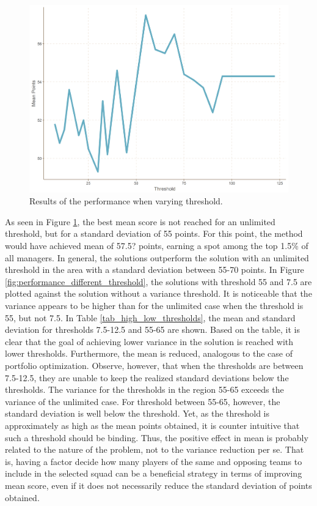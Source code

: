 \begin{figure}[H]
    \centering
    \includegraphics[scale=0.5]{fig/chapter_7/var.png}
    \caption{Results of the performance when varying threshold.}
\label{fig:performance_varying_threshold}    
\end{figure}%


As seen in Figure \ref{fig:performance_varying_threshold}, the best mean score is not reached for an unlimited threshold, but for a standard deviation of 55 points. For this point, the method would have achieved mean of 57.5? points, earning a spot among the top 1.5\% of all managers. In general, the solutions outperform the solution with an unlimited threshold in the area with a standard deviation between 55-70 points. In Figure \ref{fig:performance_different_threshold}, the solutions with threshold 55 and 7.5 are plotted against the solution without a variance threshold. It is noticeable that the variance appears to be higher than for the unlimited case when the threshold is 55, but not 7.5. In Table \ref{tab_high_low_thresholds}, the mean and standard deviation for thresholds 7.5-12.5 and 55-65 are shown. Based on the table, it is clear that the goal of achieving lower variance in the solution is reached with lower thresholds. Furthermore, the mean is reduced, analogous to the case of portfolio optimization. Observe, however, that when the thresholds are between 7.5-12.5, they are unable to keep the realized standard deviations below the thresholds. The variance for the thresholds in the region 55-65 exceeds the variance of the unlimited case. For threshold between 55-65, however, the standard deviation is well below the threshold. Yet, as the threshold is approximately as high as the mean points obtained, it is counter intuitive that such a threshold should be binding. Thus, the positive effect in mean is probably related to the nature of the problem, not to the variance reduction per se. That is, having a factor decide how many players of the same and opposing teams to include in the selected squad can be a beneficial strategy in terms of improving mean score, even if it does not necessarily reduce the standard deviation of points obtained.





